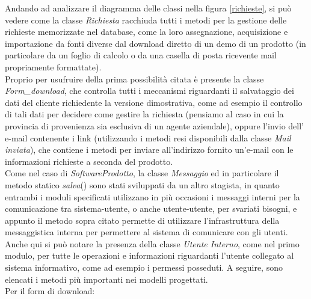 \noindent
Andando ad analizzare il diagramma delle classi nella figura \ref{richieste}, si pu\`o vedere come la classe \textit{Richiesta} racchiuda tutti i metodi per la gestione delle richieste memorizzate nel database, come la loro assegnazione, acquisizione e importazione da fonti diverse dal download diretto di un demo di un prodotto (in particolare da un foglio di calcolo o da una casella di posta ricevente mail propriamente formattate). \\
Proprio per usufruire della prima possibilit\`a citata \`e presente la classe \textit{Form\_download}, che controlla tutti i meccanismi riguardanti il salvataggio dei dati del cliente richiedente la versione dimostrativa, come ad esempio il controllo di tali dati per decidere come gestire la richiesta (pensiamo al caso in cui la provincia di provenienza sia esclusiva di un agente aziendale), oppure l'invio dell' e-mail contenente i link (utilizzando i metodi resi disponibili dalla classe \textit{Mail inviata}), che contiene i metodi per inviare all'indirizzo fornito un'e-mail con le informazioni richieste a seconda del prodotto. \\
Come nel caso di \textit{SoftwareProdotto}, la classe \textit{Messaggio} ed in particolare il metodo statico \textit{salva}() sono stati sviluppati da un altro stagista, in quanto entrambi i moduli specificati utilizzano in pi\`u occasioni i messaggi interni per la comunicazione tra sistema-utente, o anche utente-utente, per svariati bisogni, e appunto il metodo sopra citato permette di utilizzare l'infrastruttura della messaggistica interna per permettere al sistema di comunicare con gli utenti. \\
Anche qui si pu\`o notare la presenza della classe \textit{Utente Interno}, come nel primo modulo, per tutte le operazioni e informazioni riguardanti l'utente collegato al sistema informativo, come ad esempio i permessi posseduti.
A seguire, sono elencati i metodi pi\`u importanti nei modelli progettati.\\
Per il form di download:

